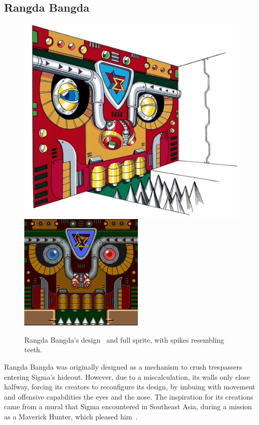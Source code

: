 \subsection{Rangda Bangda}\label{boss:Rangda_bangda}
\begin{figure}[htp]
	\centering
	\includegraphics[height=\portraitsize]{figures/X1/Sigma_stages/RangdaBangda.jpg}
	\includegraphics[height=\portraitsize]{figures/X1/Sigma_stages/Rangdabangdasprite.png}
	\caption{Rangda Bangda's design~\cite{book:MMX_Complete_art} and full sprite, with spikes resembling teeth.}
\end{figure}
Rangda Bangda was originally designed as a mechanism to crush trespassers entering Sigma's hideout. However, due to a miscalculation, its walls only close halfway, forcing its creators to reconfigure its design, by imbuing with movement and offensive capabilities the eyes and the nose. The inspiration for its creations came from a mural that Sigma encountered in Southeast Asia, during a mission as a Maverick Hunter, which pleased him~\cite{wayback:X_resources}.

